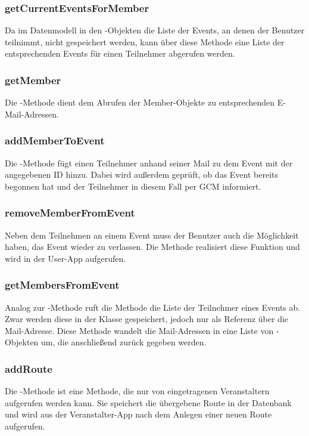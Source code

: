\subsubsection*{getCurrentEventsForMember}
Da im Datenmodell in den -Objekten die Liste der Events, an denen der Benutzer teilnimmt, nicht gespeichert werden, kann über diese Methode eine Liste der entsprechenden Events für einen Teilnehmer abgerufen werden.

\subsubsection*{getMember}
Die -Methode dient dem Abrufen der Member-Objekte zu entsprechenden E-Mail-Adressen.

\subsubsection*{addMemberToEvent}
Die -Methode fügt einen Teilnehmer anhand seiner Mail zu dem Event mit der angegebenen ID hinzu. Dabei wird außerdem geprüft, ob das Event bereits begonnen hat und der Teilnehmer in diesem Fall per GCM informiert.

\subsubsection*{removeMemberFromEvent}
Neben dem Teilnehmen an einem Event muss der Benutzer auch die Möglichkeit haben, das Event wieder zu verlassen. Die Methode  realisiert diese Funktion und wird in der User-App aufgerufen.

\subsubsection*{getMembersFromEvent}
Analog zur -Methode ruft die Methode  die Liste der Teilnehmer eines Events ab. Zwar werden diese in der Klasse  gespeichert, jedoch nur als Referenz über die Mail-Adresse. Diese Methode wandelt die Mail-Adressen in eine Liste von -Objekten um, die anschließend zurück gegeben werden.

\subsubsection*{addRoute}
Die -Methode ist eine Methode, die nur von eingetragenen Veranstaltern aufgerufen werden kann. Sie speichert die übergebene Route in der Datenbank und wird aus der Veranstalter-App nach dem Anlegen einer neuen Route aufgerufen.

